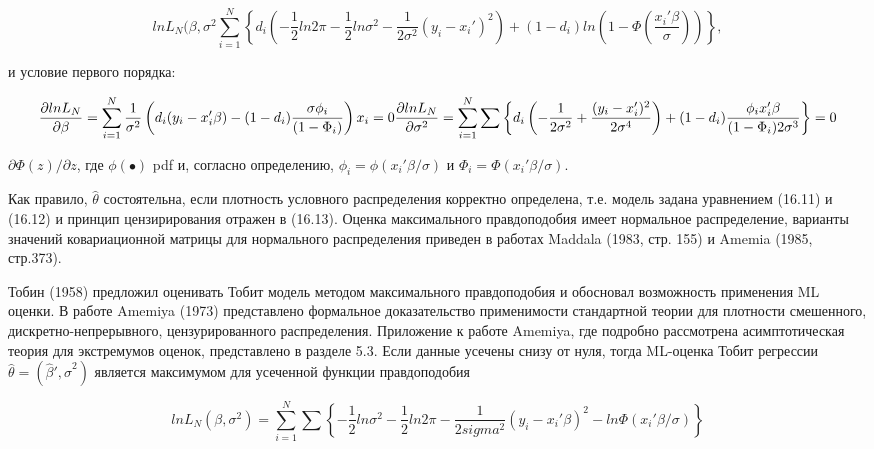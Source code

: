 \begin{equation}
ln L_N(\beta,\sigma^2\sum_{i=1}^N
\left\lbrace d_i\left(-\dfrac{1}{2}ln{2\pi}-\dfrac{1}{2}ln{\sigma^2-\dfrac{1}{2\sigma^2}(y_i-x_i')^2}\right)+(1-d_i)ln \left(1-\Phi
\left( \dfrac{x_i'\beta}{\sigma}\right)\right)\right\rbrace,
\end{equation}

и условие первого порядка:

\begin{equation}
\dfrac{\partial ln L_N}{\partial\beta}=\sum_{i=1}^N\dfrac{1}{\sigma^2}\left(d_i(y_i-x_i'\beta)-(1-d_i)\dfrac{\sigma\phi_i}{(1-\Phi_i)}\right)x_i=0 \\
\dfrac{\partial ln L_N}{\partial\sigma^2}=\sum_{i=1}^N\sum\left\lbrace d_i \left(-\dfrac{1}{2\sigma^2}+\dfrac{(y_i-x_i')^2}{2\sigma^4}\right)+(1-d_i)\dfrac{\phi_i x_i'\beta}{(1-\Phi_i)2\sigma^3}\right\rbrace=0
\end{equation}


$\partial\Phi(z)/\partial{z}$, где $\phi(\bullet)$ pdf и, согласно определению, $\phi_i=\phi(x_i'\beta/\sigma)$ и $\Phi_i=\Phi(x_i'\beta/\sigma)$.


Как правило, $\hat{\theta}$ состоятельна, если плотность условного распределения корректно определена, т.е. модель задана уравнением (16.11) и (16.12) и принцип цензирирования отражен в (16.13). Оценка максимального правдоподобия имеет нормальное распределение, варианты значений ковариационной матрицы для нормального распределения приведен в работах Maddala (1983, стр. 155) и Amemia (1985, стр.373).

Тобин (1958) предложил оценивать Тобит модель методом максимального правдоподобия и обосновал возможность применения ML оценки. В работе Amemiya (1973) представлено формальное доказательство применимости стандартной теории для плотности смешенного, дискретно-непрерывного, цензурированного распределения. Приложение к работе Amemiya, где подробно рассмотрена асимптотическая теория для экстремумов оценок, представлено в разделе 5.3.
Если данные усечены снизу от нуля, тогда ML-оценка Тобит регрессии $\hat{\theta}=(\hat{\beta}',\hat{\sigma}^2)$ является максимумом для усеченной функции правдоподобия


\begin{equation}
ln{L_N(\beta,\sigma^2)}=\sum_{i=1}^N{\sum\left\lbrace -\dfrac{1}{2}ln{\sigma^2}-\dfrac{1}{2}{ln{2\pi}}-\dfrac{1}{2sigma^2}(y_i-x_i'\beta)^2-ln{\Phi(x_i'\beta/\sigma)}\right\rbrace }
\end{equation}

